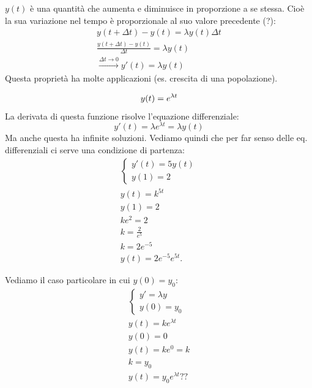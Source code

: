 \begin{proprieta}
    $y(t)$ è una quantità che aumenta e diminuisce in proporzione a se stessa. Cioè la sua variazione nel tempo è proporzionale al suo valore precedente (?):
    \begin{gather*}
        y(t+\Delta t) - y(t) = \lambda y(t)\Delta t \\
        \frac{y(t+\Delta t) - y(t)}{\Delta t} = \lambda y(t) \\
        \xrightarrow{\Delta t \to 0} y'(t) = \lambda y(t)
    \end{gather*}
    Questa proprietà ha molte applicazioni (es. crescita di una popolazione).
\end{proprieta}

\begin{esempio}
    \begin{equation*}
        y(t) = e^{\lambda t} \\
    \end{equation*}
    La derivata di questa funzione risolve l'equazione differenziale:
    \begin{equation*}
        y'(t) = \lambda e^{\lambda t} = \lambda y(t)
    \end{equation*}
    Ma anche questa ha infinite soluzioni. Vediamo quindi che per far senso delle eq. differenziali ci serve una condizione di partenza:
    \begin{gather*}
        \begin{cases}
            y'(t) = 5y(t) \\
            y(1) = 2
        \end{cases} \\
        y(t) = k^{5t} \\
        y(1) = 2 \\
        ke^2 = 2 \\
        k =  \frac{2}{e^5} \\
        k = 2e^{-5} \\
        y(t) = 2e^{-5}e^{5t}.
    \end{gather*}
\end{esempio}

Vediamo il caso particolare in cui $y(0) = y_0$:
\begin{gather*}
    \begin{cases}
    y' = \lambda y \\
    y(0) = y_0
    \end{cases} \\
    y(t) = ke^{\lambda t} \\
    y(0) = 0 \\
    y(t) = ke^0 = k \\
    k = y_0 \\
    y(t) = y_0 e^{\lambda t} ??
\end{gather*}

